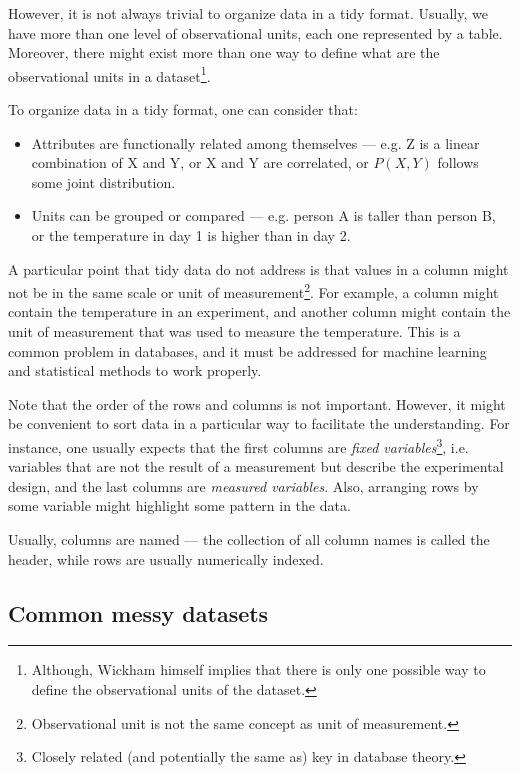 However, it is not always trivial to organize data in a tidy format.  Usually, we have
more than one level of observational units, each one represented by a table.  Moreover,
there might exist more than one way to define what are the observational units in a
dataset\footnote{Although, Wickham himself implies that there is only one possible way to
define the observational units of the dataset.}.

To organize data in a tidy format, one can consider that:
\begin{itemize}
  \itemsep0em
  \item Attributes are functionally related among themselves --- e.g. Z is a linear
    combination of X and Y, or X and Y are correlated, or $P(X, Y)$ follows some joint distribution.
  \item Units can be grouped or compared --- e.g. person A is taller than person B, or
    the temperature in day 1 is higher than in day 2.
\end{itemize}

A particular point that tidy data do not address is that values in a column might not be
in the same scale or unit of measurement\footnote{Observational unit is not the same
concept as unit of measurement.}.  For example, a column might contain the
temperature in an experiment, and another column might contain the unit of measurement
that was used to measure the temperature.  This is a common problem in databases, and it
must be addressed for machine learning and statistical methods to work properly.

Note that the order of the rows and columns is not important.  However, it might be
convenient to sort data in a particular way to facilitate the understanding.  For
instance, one usually expects that the first columns are \emph{fixed
variables}\footnote{Closely related (and potentially the same as) key in database
theory.}, i.e. variables that are not the result of a measurement but describe the experimental design, and the last columns
are \emph{measured variables}.  Also, arranging rows by some variable might highlight some
pattern in the data.

Usually, columns are named --- the collection of all column names is called the
header, while rows are usually numerically indexed.

\subsection{Common messy datasets}

